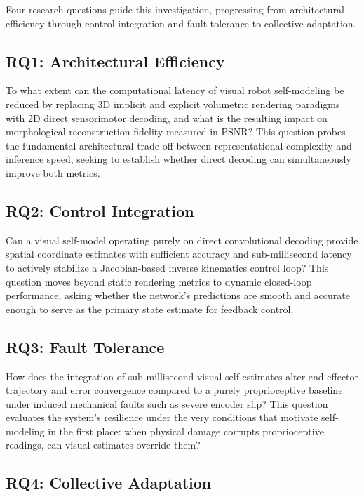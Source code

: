 ﻿\documentclass[12pt,a4paper,oneside]{report}
\begin{document}
Four research questions guide this investigation, progressing from architectural efficiency through control integration and fault tolerance to collective adaptation.

\subsection{RQ1: Architectural Efficiency}

To what extent can the computational latency of visual robot self-modeling be reduced by replacing 3D implicit and explicit volumetric rendering paradigms with 2D direct sensorimotor decoding, and what is the resulting impact on morphological reconstruction fidelity measured in PSNR? This question probes the fundamental architectural trade-off between representational complexity and inference speed, seeking to establish whether direct decoding can simultaneously improve both metrics.

\subsection{RQ2: Control Integration}

Can a visual self-model operating purely on direct convolutional decoding provide spatial coordinate estimates with sufficient accuracy and sub-millisecond latency to actively stabilize a Jacobian-based inverse kinematics control loop? This question moves beyond static rendering metrics to dynamic closed-loop performance, asking whether the network's predictions are smooth and accurate enough to serve as the primary state estimate for feedback control.

\subsection{RQ3: Fault Tolerance}

How does the integration of sub-millisecond visual self-estimates alter end-effector trajectory and error convergence compared to a purely proprioceptive baseline under induced mechanical faults such as severe encoder slip? This question evaluates the system's resilience under the very conditions that motivate self-modeling in the first place: when physical damage corrupts proprioceptive readings, can visual estimates override them?

\subsection{RQ4: Collective Adaptation}
\end{document}
